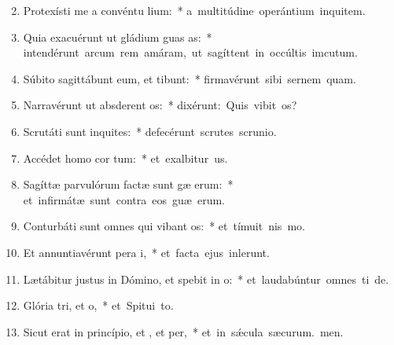 \begin{flushleft}
\begin{enumerate}[leftmargin=*]
\setcounter{enumi}{1}

\item Protexísti me a convéntu lium:~* \mbox{a multitúdine operántium inquitem.}

\item Quia exacuérunt ut gládium guas as:~* \mbox{intendérunt arcum rem amáram, ut sagíttent in occúltis imcutum.}

\item Súbito sagittábunt eum, et  tibunt:~* \mbox{firmavérunt sibi sernem quam.}

\item Narravérunt ut absderent os:~* \mbox{dixérunt: Quis vibit os?}

\item Scrutáti sunt inquites:~* \mbox{defecérunt scrutes scrunio.}

\item Accédet homo  cor tum:~* \mbox{et exalbitur us.}

\item Sagíttæ parvulórum factæ sunt gæ erum:~* \mbox{et infirmátæ sunt contra eos guæ erum.}

\item Conturbáti sunt omnes qui vibant os:~* \mbox{et tímuit nis mo.}

\item Et annuntiavérunt pera i,~* \mbox{et facta ejus inlerunt.}

\item Lætábitur justus in Dómino, et spebit in o:~* \mbox{et laudabúntur omnes ti de.}

\item Glória tri, et o,~* \mbox{et Spitui to.}

\item Sicut erat in princípio, et , et per,~* \mbox{et in sǽcula sæcurum. men.}

\end{enumerate}
\end{flushleft}